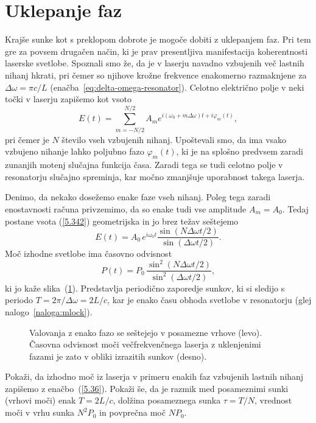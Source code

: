 \section{Uklepanje faz}
\label{chap:Uklepanje}
Krajše sunke kot s preklopom dobrote je mogoče dobiti z uklepanjem faz.
Pri tem gre za povsem drugačen način, ki je prav presentljiva manifestacija 
koherentnosti laserske svetlobe. Spoznali smo že, da je v laserju navadno 
vzbujenih več lastnih nihanj hkrati, pri čemer so njihove krožne frekvence 
enakomerno razmaknjene za $\Delta \omega =\pi c/L$ 
(enačba~\ref{eq:delta-omega-resonator}). Celotno električno
polje v neki točki v laserju zapišemo kot vsoto 
\begin{equation}
E(t)=\sum_{m=-N/2}^{N/2}A_{m}e^{i(\omega _{0}+m\Delta \omega )t+i\varphi
_{m}(t)},
\label{5.342}
\end{equation}
pri čemer je $N$ število vseh vzbujenih nihanj. Upoštevali smo, da ima vsako
vzbujeno nihanje lahko poljubno fazo $\varphi _{m}(t)$, ki je na splošno predvsem
zaradi zunanjih motenj slučajna funkcija časa. Zaradi tega se tudi
celotno polje v resonatorju slučajno spreminja, kar močno zmanjšuje uporabnost
takega laserja.

Denimo, da nekako dosežemo enake faze vseh nihanj. Poleg tega zaradi enostavnosti
računa privzemimo, da so enake tudi vse amplitude $A_{m}= A_0$. Tedaj
postane vsota (\ref{5.342}) geometrijska in jo brez težav seštejemo 
\begin{equation}
E(t)=A_{0}\,e^{i\omega _{0}t}\frac{\sin (N\Delta \omega t/2)}{\sin(\Delta
\omega t/2)}.
\label{5.352}
\end{equation}
Moč izhodne svetlobe ima časovno odvisnost 
\begin{equation}
P(t)=P_{0}\,\frac{\sin ^{2}(N\Delta \omega t/2)}{\sin ^{2}(\Delta \omega t/2)},
\label{5.36}
\end{equation}
ki jo kaže slika~(\ref{s5.10}). Predstavlja periodično zaporedje sunkov, 
ki si sledijo s periodo $T=2\pi /\Delta \omega =2L/c$, kar je enako času obhoda
svetlobe v resonatorju (glej nalogo~\ref{naloga:mlock}). 
\begin{figure}[h]
\centering
\def\svgwidth{140truemm} 

\caption{Valovanja z enako fazo se seštejejo v posamezne vrhove (levo). Časovna odvisnost moči večfrekvenčnega laserja z uklenjenimi fazami je zato v obliki izrazitih sunkov (desno).}
\label{s5.10}
\end{figure}
\begin{definition}
\label{naloga:mlock}
Pokaži, da izhodno moč iz laserja v primeru enakih faz vzbujenih lastnih nihanj
zapišemo z enačbo~(\ref{5.36}). Pokaži še, da je razmik med posameznimi sunki (vrhovi
moči) enak $T=2L/c$, dolžina posameznega sunka $\tau = T/N$, vrednost moči v vrhu 
sunka $N^{2}P_{0}$ in povprečna moč $NP_{0}$.
\end{definition}

